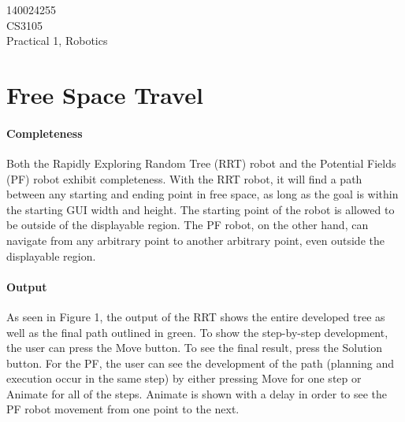 \documentclass[12pt]{article}
\begin{document}
\begin{flushright}
140024255\\
CS3105\\
Practical 1, Robotics
\end{flushright}

\section{Free Space Travel}
\paragraph*{Completeness}
Both the Rapidly Exploring Random Tree (RRT) robot and the Potential Fields (PF) robot exhibit completeness. With the RRT robot, it will find a path between any starting and ending point in free space, as long as the goal is within the starting GUI width and height. The starting point of the robot is allowed to be outside of the displayable region. The PF robot, on the other hand, can navigate from any arbitrary point to another arbitrary point, even outside the displayable region.

\paragraph*{Output}
As seen in Figure 1, the output of the RRT shows the entire developed tree as well as the final path outlined in green. To show the step-by-step development, the user can press the Move button. To see the final result, press the Solution button. For the PF, the user can see the development of the path (planning and execution occur in the same step) by either pressing Move for one step or Animate for all of the steps. Animate is shown with a delay in order to see the PF robot movement from one point to the next.
\end{document}

